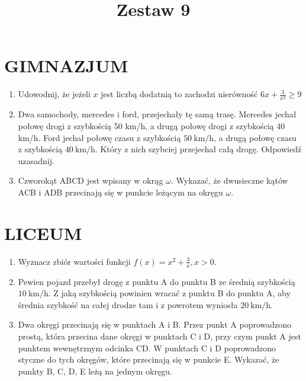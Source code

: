 \documentclass[10pt]{article}
\title{Zestaw 9 }
\author{}
\date{}
\begin{document}
\maketitle
\section*{GIMNAZJUM}
\begin{enumerate}
  \item Udowodnij, że jeżeli \(x\) jest liczbą dodatnią to zachodzi nierówność \(6 x+\frac{3}{x^{2}} \geq 9\)
  \item Dwa samochody, mercedes i ford, przejechały tę samą trasę. Mercedes jechał połowę drogi z szybkością 50 km/h, a drugą połowę drogi z szybkością 40 km/h. Ford jechał połowę czasu z szybkością \(50 \mathrm{~km} / \mathrm{h}\), a drugą połowę czasu z szybkością \(40 \mathrm{~km} / \mathrm{h}\). Który z nich szybciej przejechał całą drogę. Odpowiedź uzasadnij.
  \item Czworokąt ABCD jest wpisany w okrąg \(\omega\). Wykazać, że dwusieczne kątów ACB i ADB przecinają się w punkcie leżącym na okręgu \(\omega\).
\end{enumerate}

\section*{LICEUM}
\begin{enumerate}
  \item Wyznacz zbiór wartości funkcji \(f(x)=x^{2}+\frac{3}{x}, x>0\).
  \item Pewien pojazd przebył drogę z punktu A do punktu B ze średnią szybkością \(10 \mathrm{~km} / \mathrm{h}\). Z jaką szybkością powinien wracać z punktu B do punktu A, aby średnia szybkość na całej drodze tam i z powrotem wyniosła \(20 \mathrm{~km} / \mathrm{h}\).
  \item Dwa okręgi przecinają się w punktach A i B. Przez punkt A poprowadzono prostą, która przecina dane okręgi w punktach C i D, przy czym punkt A jest punktem wewnętrznym odcinka CD. W punktach C i D poprowadzono styczne do tych okręgów, które przecinają się w punkcie E. Wykazać, że punkty B, C, D, E leżą na jednym okręgu.
\end{enumerate}
\end{document}
